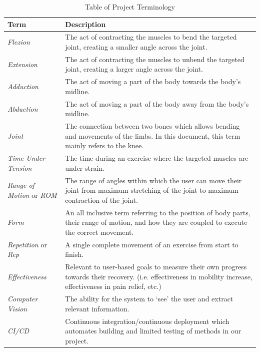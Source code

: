 \documentclass[12pt]{article}
\begin{document}
\begin{table}[H]
\centering
\begin{tabular}{|l m{10cm}|}
  \hline
  \textbf{Term} & \textbf{Description} \\
  \hline \hline
  \textit{Flexion} & The act of contracting the muscles to bend the targeted joint, creating a smaller angle across the joint. \\ \hline
  \textit{Extension} & The act of contracting the muscles to unbend the targeted joint, creating a larger angle across the joint. \\ \hline
  \textit{Adduction} & The act of moving a part of the body towards the body’s midline. \\ \hline
  \textit{Abduction} & The act of moving a part of the body away from the body’s midline. \\ \hline
  \textit{Joint} & The connection between two bones which allows bending and movements of the limbs. In this document, this term mainly refers to the knee. \\ \hline
  \textit{Time Under Tension} & The time during an exercise where the targeted muscles are under strain. \\ \hline
  \textit{Range of Motion} or \textit{ROM} & The range of angles within which the user can move their joint from maximum stretching of the joint to maximum contraction of the joint. \\ \hline
  \textit{Form} & An all inclusive term referring to the position of body parts, their range of motion, and how they are coupled to execute the correct movement. \\ \hline
  \textit{Repetition} or \textit{Rep} & A single complete movement of an exercise from start to finish. \\ \hline
  \textit{Effectiveness} & Relevant to user-based goals to measure their own progress towards their recovery. (i.e. effectiveness in mobility increase, effectiveness in pain relief, etc.) \\ \hline
  \textit{Computer Vision} & The ability for the system to ‘see’ the user and extract relevant information. \\ \hline
  \textit{CI/CD} & Continuous integration/continuous deployment which automates building and limited testing of methods in our project. \\ \hline
\end{tabular}
\caption{Table of Project Terminology}
\end{table}
\end{document}
